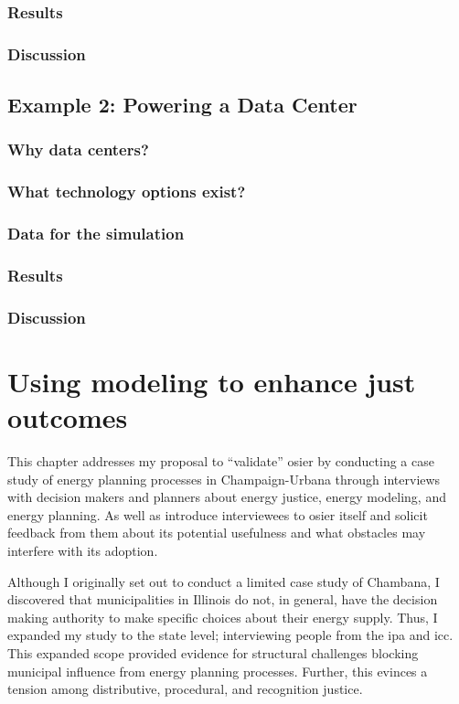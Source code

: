 \subsection{Results}

\subsection{Discussion}

\section{Example 2: Powering a Data Center}

\subsection{Why data centers?}

\subsection{What technology options exist?}

\subsection{Data for the simulation}

\subsection{Results}

\subsection{Discussion}

\chapter{Using modeling to enhance just outcomes}

This chapter addresses my proposal to ``validate'' \ac{osier} by conducting a
case study of energy planning processes in Champaign-Urbana through interviews
with decision makers and planners about energy justice, energy modeling, and
energy planning. As well as introduce interviewees to \ac{osier} itself and
solicit feedback from them about its potential usefulness and what obstacles may
interfere with its adoption. 

Although I originally set out to conduct a limited case study of Chambana, I
discovered that municipalities in Illinois do not, in general, have the decision
making authority to make specific choices about their energy supply.
Thus, I expanded my study to the state level; interviewing people from the
\ac{ipa} and \ac{icc}. This expanded scope provided evidence for structural
challenges blocking municipal influence from energy planning processes. Further,
this evinces a tension among distributive, procedural, and recognition justice.

